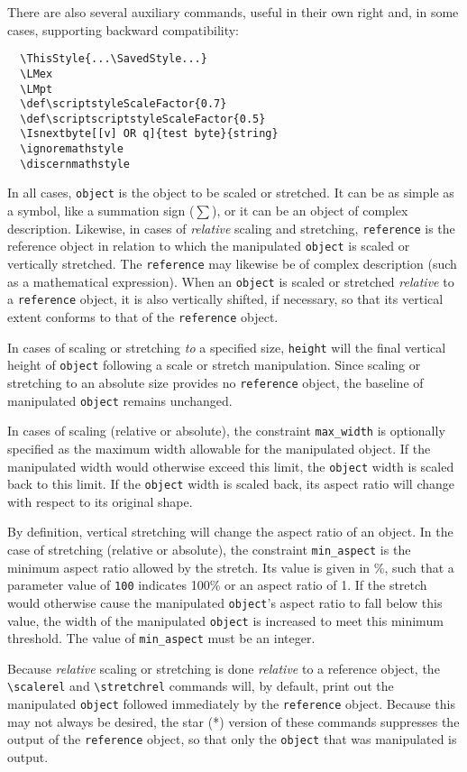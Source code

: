 \documentclass{article}
\let\vb\verb
\newcommand\margcmd[1]{\marginpar{\hfill\ttfamily\char'134#1}}
\begin{document}
There are also several auxiliary commands, useful in their own
right and, in some cases, supporting backward compatibility:
\begin{verbatim}
  \ThisStyle{...\SavedStyle...}
  \LMex
  \LMpt
  \def\scriptstyleScaleFactor{0.7}
  \def\scriptscriptstyleScaleFactor{0.5}
  \Isnextbyte[[v] OR q]{test byte}{string}
  \ignoremathstyle
  \discernmathstyle
\end{verbatim}

In all cases, \vb|object| is the object to be scaled or 
stretched.  It can be as simple as a symbol, like a summation sign
($\sum$), or it can be an object of complex description.  Likewise, in
cases of \textit{relative} scaling and stretching, \vb|reference| is
the reference object in relation to which the manipulated
\vb|object| is scaled or vertically stretched.  The \vb|reference|
may likewise be of complex description (such as a mathematical
expression).  When an \vb|object| is scaled or stretched
\textit{relative} to a \vb|reference| object, it is also vertically
shifted, if necessary, so that its vertical extent conforms to that of
the \vb|reference| object.

In cases of scaling or stretching \textit{to} a specified size,
\vb|height| will the final vertical height of \vb|object| following
a scale or stretch manipulation.  Since scaling or stretching to an
absolute size provides no \vb|reference| object, the baseline of
manipulated \vb|object| remains unchanged.

In cases of scaling (relative or absolute), the constraint
\vb|max_width| is optionally specified as the maximum width allowable
for the manipulated object.  If the manipulated width would otherwise
exceed this limit, the
\vb|object| width is scaled back to this limit.  If the \vb|object|
width is scaled back, its aspect ratio will change with respect to its
original shape.

By definition, vertical stretching will change the aspect ratio of an
object.  In the case of stretching (relative or absolute), the
constraint \vb|min_aspect| is the minimum aspect ratio allowed by the
stretch.  Its value is given in \%, such that a parameter value of
\texttt{100} indicates 100\% or an aspect ratio of 1.  If the stretch
would otherwise cause the manipulated \vb|object|'s aspect ratio to
fall below this value, the width of the manipulated \vb|object| is
increased to meet this minimum threshold.  The value of
\vb|min_aspect| must be an integer.

Because \textit{relative} scaling or stretching is done
\textit{relative} to a reference object, the \vb|\scalerel| and
\margcmd{scalerel}\margcmd{stretchrel}%
\vb|\stretchrel| commands will, by default, print out the
manipulated \vb|object| followed immediately by the \vb|reference|
object.  Because this may not always be desired, the star (*) version of
these commands suppresses the output of the \vb|reference| object, so
that only the \vb|object| that was manipulated is output.
\end{document}
